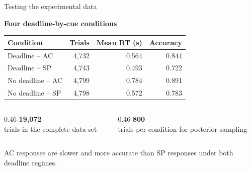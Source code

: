 \documentclass[aspectratio=43,10pt]{beamer}
\newcommand{\greenheading}[1]{%
  {\color{TUGreen}\fontsize{12}{14}\selectfont\bfseries #1\par}%
}
\newcommand{\metric}[2]{%
  {\color{TUGreen}\fontsize{20}{22}\selectfont\bfseries #1}\\[-0.06cm]
  {\fontsize{9.5}{11.5}\selectfont #2}%
}
\begin{document}
\begin{frame}{Testing the experimental data}
  \vspace{0.10cm}
  \greenheading{Four deadline-by-cue conditions}
  \vspace{0.10cm}
  {\fontsize{10.2}{12.5}\selectfont
  \begin{tabularx}{\textwidth}{>{\raggedright\arraybackslash}X r r r}
    \toprule
    \textbf{Condition} & \textbf{Trials} & \textbf{Mean RT (s)} & \textbf{Accuracy} \\
    \midrule
    Deadline -- AC & 4,732 & 0.564 & 0.844 \\
    Deadline -- SP & 4,743 & 0.493 & 0.722 \\
    No deadline -- AC & 4,799 & 0.784 & 0.891 \\
    No deadline -- SP & 4,798 & 0.572 & 0.783 \\
    \bottomrule
  \end{tabularx}}

  \vspace{0.42cm}
  \begin{columns}[T,onlytextwidth]
    \begin{column}{0.46\textwidth}\metric{19,072}{trials in the complete data set}\end{column}
    \begin{column}{0.46\textwidth}\metric{800}{trials per condition for posterior sampling}\end{column}
  \end{columns}

  \vspace{0.28cm}
  {\color{TUMuted}\fontsize{9.8}{12}\selectfont
  AC responses are slower and more accurate than SP responses under both deadline regimes.}
\end{frame}
\end{document}
